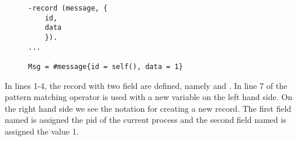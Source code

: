 \begin{figure}[h!]
\begin{verbatim}
-record (message, {
	id,
	data
	}).
...

Msg = #message{id = self(), data = 1}
\end{verbatim}
\end{figure}


In lines 1-4, the  record with two field are defined, namely  and . In line 7 of the pattern matching operator is used with a new variable  on the left hand side. On the right hand side we see the notation for creating a new record. The first field named  is assigned the pid of the current process and the second field named  is assigned the value 1.
